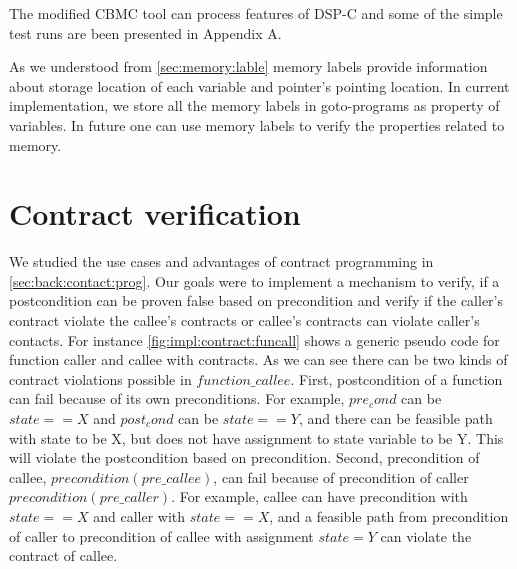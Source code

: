 The modified CBMC tool can process features of DSP-C and some of the simple test runs are been presented in Appendix A.

As we understood from \autoref{sec:memory:lable} memory labels provide information about storage location of each variable and pointer's pointing location. In current implementation, we store all the memory labels in goto-programs as property of variables. In future one can use memory labels to verify the properties related to memory.


\section{Contract verification} \label{impl:contracts}

We studied the use cases and advantages of contract programming in \autoref{sec:back:contact:prog}. Our goals were to implement a mechanism to verify, if a postcondition can be proven false based on precondition and verify if the caller's contract violate the callee's contracts or callee's contracts can violate caller's contacts. For instance \autoref{fig:impl:contract:funcall} shows a generic pseudo code for function caller and callee with contracts. As we can see there can be two kinds of contract violations possible in $function\_callee$. First, postcondition of a function can fail because of its own preconditions. For example, $pre_cond$ can be $state==X$ and $post_cond$ can be $state==Y$, and there can be feasible path with state to be X, but does not have assignment to state variable to be Y. This will violate the postcondition based on precondition. Second, precondition of callee, $precondition(pre\_callee)$, can fail because of precondition of caller $precondition(pre\_caller)$.  For example, callee can have precondition with $state==X$ and caller with $state==X$, and a feasible path from precondition of caller to precondition of callee with assignment $state=Y$ can violate the contract of callee.

